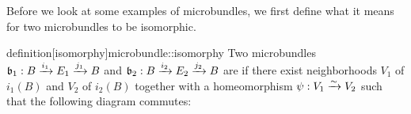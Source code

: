 \begin{myparagraph}
    Before we look at some examples of microbundles,
    we first define what it means for two microbundles to be isomorphic.
\end{myparagraph}

\begin{mystatement}{definition}[isomorphy]{microbundle::isomorphy}
    Two microbundles $\bundledef{\bb_1}{B}{E_1}{i_1}{j_1}$ and $\bundledef{\bb_2}{B}{E_2}{i_2}{j_2}$
    are  if there exist neighborhoods $V_1$ of $i_1(B)$ and $V_2$ of $i_2(B)$
    together with a homeomorphism $\psi: V_1 \xrightarrow{\sim} V_2$
    such that the following diagram commutes: 
    \begin{center}
    \end{center}
\end{mystatement}